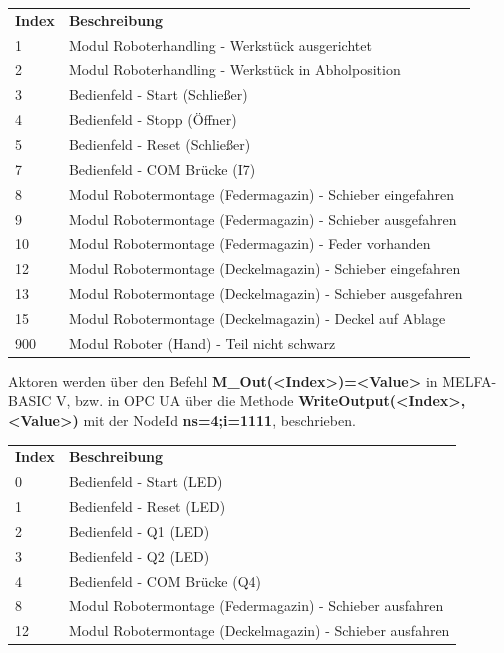 \documentclass[11pt,a4paper,ngerman]{article}
\begin{document}
\begin{center}
	\setlength\extrarowheight{4pt}
	\small
	\begin{tabularx}{\textwidth}{|p{1cm}|X|}
		\hline
		\rowcolor{tublau}
		\multicolumn{2}{|c|}{\bf \color{white} \large Sensoren}\\
		\hline\hline
		\rowcolor{gray!80}
		\bf Index & \bf Beschreibung\\
		\hline\hline
		1 & Modul Roboterhandling - Werkstück ausgerichtet\\
		2 & Modul Roboterhandling - Werkstück in Abholposition\\
		3 & Bedienfeld - Start (Schließer)\\
		4 & Bedienfeld - Stopp (Öffner) \\
		5 & Bedienfeld - Reset (Schließer)\\
		7 & Bedienfeld - COM Brücke (I7)\\
		8 & Modul Robotermontage (Federmagazin) - Schieber eingefahren\\
		9 & Modul Robotermontage (Federmagazin) - Schieber ausgefahren\\
		10 & Modul Robotermontage (Federmagazin) - Feder vorhanden \\
		12 & Modul Robotermontage (Deckelmagazin) - Schieber eingefahren\\
		13 & Modul Robotermontage (Deckelmagazin) - Schieber ausgefahren\\
		15 & Modul Robotermontage (Deckelmagazin) - Deckel auf Ablage\\
		900 & Modul Roboter (Hand) - Teil nicht schwarz\\
		\hline
	\end{tabularx}
\end{center}
Aktoren werden über den Befehl \textbf{M\_Out(<Index>)=<Value>} in MELFA-BASIC V, bzw. in OPC UA über die Methode \textbf{WriteOutput(<Index>,<Value>)} mit der NodeId \textbf{ns=4;i=1111}, beschrieben.
\begin{center}
	\setlength\extrarowheight{4pt}
	\small
	\begin{tabularx}{\textwidth}{|p{1cm}|X|}
		\hline
		\rowcolor{tublau}
		\multicolumn{2}{|c|}{\bf \color{white} \large Aktoren}\\
		\hline\hline
		\rowcolor{gray!80}
		\bf Index & \bf Beschreibung\\
		\hline\hline
		0 & Bedienfeld - Start (LED)\\
		1 & Bedienfeld - Reset (LED)\\
		2 & Bedienfeld - Q1 (LED)\\
		3 & Bedienfeld - Q2 (LED)\\
		4 & Bedienfeld - COM Brücke (Q4)\\
		8 & Modul Robotermontage (Federmagazin) - Schieber ausfahren\\
		12 & Modul Robotermontage (Deckelmagazin) - Schieber ausfahren\\
		\hline
	\end{tabularx}
\end{center}
\end{document}
